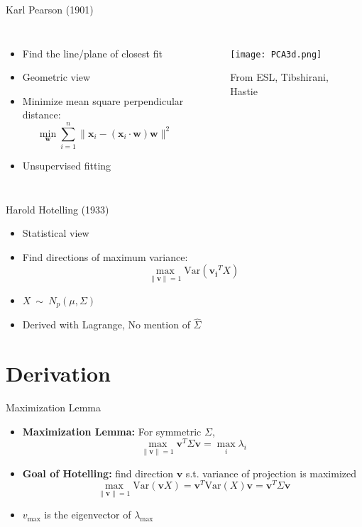 \documentclass{beamer}
\begin{document}
\begin{frame}{Karl Pearson (1901)}
    \begin{columns}
        \begin{itemize}
        \item Find the line/plane of closest fit
        \item Geometric view
        \item Minimize mean square perpendicular distance:
        \[
            \min_{\mathbf{w}} \sum_{i=1}^n \| \mathbf{x}_i - (\mathbf{x}_i \cdot \mathbf{w})\mathbf{w} \|^2
        \]
        \item Unsupervised fitting
    \end{itemize}
    \begin{figure}
        \texttt{[image: PCA3d.png]}
        \caption{From ESL, Tibshirani, Hastie}
    \end{figure}
    \end{columns}
    
\end{frame}


\begin{frame}{Harold Hotelling (1933)}
    \begin{itemize}
        \item Statistical view
        \item Find directions of maximum variance:
        \[
            \max_{\|\mathbf{v}\| = 1} \text{Var}(\mathbf{v_i}^TX) 
        \]
        \item \(X \ \sim \ N_p(\mu, \Sigma)\)
        \item Derived with Lagrange, No mention of \(\hat{\Sigma}\)
    \end{itemize}
\end{frame}

\section{Derivation}


\begin{frame}{Maximization Lemma}
    \begin{itemize}
        \item \textbf{Maximization Lemma:} For symmetric $\Sigma$, \[ \max_{\|\mathbf{v}\| = 1} \mathbf{v}^T \Sigma \mathbf{v} = \max_i \lambda_i\]
        \item \textbf{Goal of Hotelling:} find direction $\mathbf{v}$ s.t. variance of projection is maximized
        \[
            \max_{\|\mathbf{v}\| = 1} \text{Var}(\mathbf{v}X) = \mathbf{v}^T \text{Var}(X)\mathbf{v} = \mathbf{v}^T \Sigma \mathbf{v}
        \]
        \item \(v_{\max}\) is the eigenvector of \(\lambda_{\max}\)
    \end{itemize}
\end{frame}
\end{document}
